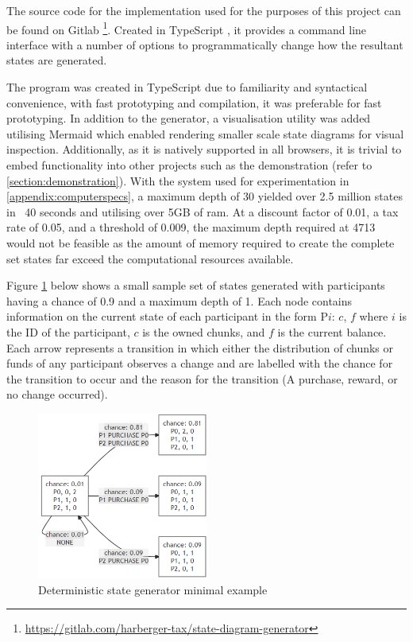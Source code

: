 The source code for the implementation used for the purposes of this project can be found on Gitlab \footnote{\url{https://gitlab.com/harberger-tax/state-diagram-generator}}. Created in TypeScript \cite{typescript2020}, it provides a command line interface with a number of options to programmatically change how the resultant states are generated. 

The program was created in TypeScript due to familiarity and syntactical convenience, with fast prototyping and compilation, it was preferable for fast prototyping. In addition to the generator, a visualisation utility was added utilising Mermaid \cite{mermaid} which enabled rendering smaller scale state diagrams for visual inspection. Additionally, as it is natively supported in all browsers, it is trivial to embed functionality into other projects such as the demonstration (refer to \cref{section:demonstration}). With the system used for experimentation in \cref{appendix:computerspecs}, a maximum depth of 30 yielded over 2.5 million states in ~40 seconds and utilising over 5GB of ram. At a discount factor of 0.01, a tax rate of 0.05, and a threshold of 0.009, the maximum depth required at 4713 would not be feasible as the amount of memory required to create the complete set states far exceed the computational resources available.

Figure \ref{figure:state-diagram-small} below shows a small sample set of states generated with participants having a chance of 0.9 and a maximum depth of 1. Each node contains information on the current state of each participant in the form P$i$: $c$, $f$ where $i$ is the ID of the participant, $c$ is the owned chunks, and $f$ is the current balance. Each arrow represents a transition in which either the distribution of chunks or funds of any participant observes a change and are labelled with the chance for the transition to occur and the reason for the transition (A purchase, reward, or no change occurred).

\begin{figure}[H]
  \centering
  \caption{Deterministic state generator minimal example}
  \label{figure:state-diagram-small}
  \includegraphics[width=0.5\textwidth]{media/state-diagram-small.PNG}
\end{figure}
